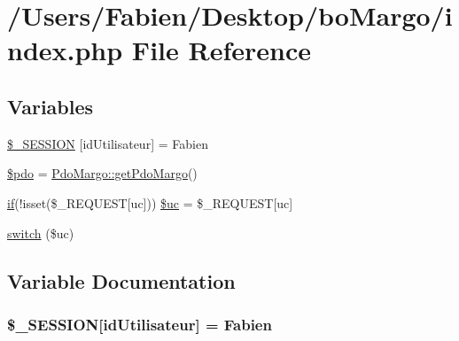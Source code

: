 \hypertarget{index_8php}{}\section{/\+Users/\+Fabien/\+Desktop/bo\+Margo/index.php File Reference}
\label{index_8php}
\subsection*{Variables}
\begin{DoxyCompactItemize}
\item 
\hyperlink{index_8php_aca51bf92bcaedb84e1dacac115463cf6}{\$\+\_\+\+S\+E\+S\+S\+I\+O\+N} \mbox{[}\textquotesingle{}id\+Utilisateur\textquotesingle{}\mbox{]} = \textquotesingle{}Fabien\textquotesingle{}
\item 
\hyperlink{index_8php_a5766efd703cef0e00bfc06b3f3acbe0e}{\$pdo} = \hyperlink{class_pdo_margo_ab1f38545bf98095f454b747fbc937167}{Pdo\+Margo\+::get\+Pdo\+Margo}()
\item 
\hyperlink{bootstrap_8min_8js_a87cf461060832b8b68a7b48d9e371e4f}{if}(!isset(\$\+\_\+\+R\+E\+Q\+U\+E\+S\+T\mbox{[}\textquotesingle{}uc\textquotesingle{}\mbox{]})) \hyperlink{index_8php_a55340ffe7841a0010c930e0bbe7b6a92}{\$uc} = \$\+\_\+\+R\+E\+Q\+U\+E\+S\+T\mbox{[}\textquotesingle{}uc\textquotesingle{}\mbox{]}
\item 
\hyperlink{index_8php_a6160ae6d9a60bbcc19780fa9bc2c9b41}{switch} (\$uc)
\end{DoxyCompactItemize}


\subsection{Variable Documentation}
\hypertarget{index_8php_aca51bf92bcaedb84e1dacac115463cf6}{}
\subsubsection[{\$\+\_\+\+S\+E\+S\+S\+I\+O\+N}]{\setlength{\rightskip}{0pt plus 5cm}\$\+\_\+\+S\+E\+S\+S\+I\+O\+N\mbox{[}\textquotesingle{}id\+Utilisateur\textquotesingle{}\mbox{]} = \textquotesingle{}Fabien\textquotesingle{}}\label{index_8php_aca51bf92bcaedb84e1dacac115463cf6}
\hypertarget{index_8php_a5766efd703cef0e00bfc06b3f3acbe0e}{}
